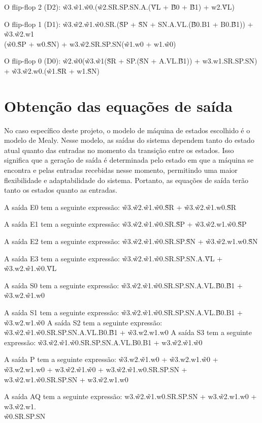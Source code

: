 O flip-flop 2 (D2): \~w3.\~w1.\~w0.(\~w2.SR.SP.SN.A.(\~VL + \~B0 + \~B1) + w2.\~VL)

O flip-flop 1 (D1): \~w3.\~w2.\~w1.\~w0.SR.(\~SP + \~SN + SN.A.VL.(\~B0.B1 + B0.\~B1)) + \~w3.\~w2.w1\\(\~w0.\~SP + w0.\~SN) + w3.\~w2.SR.SP.SN(\~w1.w0 + w1.\~w0)

O flip-flop 0 (D0): \~w2.\~w0(\~w3.\~w1(\~SR + SP.(\~SN + A.VL.\~B1)) + w3.w1.SR.SP.SN) + \~w3.\~w2.w0.(\~w1.\~SR + w1.\~SN)

\section{Obtenção das equações de saída}

No caso específico deste projeto, o modelo de máquina de estados escolhido é o modelo de Mealy. Nesse modelo, as saídas do sistema dependem tanto do estado atual quanto das entradas no momento da transição entre os estados. Isso significa que a geração de saída é determinada pelo estado em que a máquina se encontra e pelas entradas recebidas nesse momento, permitindo uma maior flexibilidade e adaptabilidade do sistema. Portanto, as equações de saída terão tanto os estados quanto as entradas.

A saída E0 tem a seguinte expressão: \~w3.\~w2.\~w1.\~w0.\~SR + \~w3.\~w2.\~w1.w0.\~SR		

A saída E1 tem a seguinte expressão: \~w3.\~w2.\~w1.\~w0.SR.\~SP + \~w3.\~w2.w1.\~w0.\~SP	

A saída E2 tem a seguinte expressão: \~w3.\~w2.\~w1.\~w0.SR.SP.\~SN + \~w3.\~w2.w1.w0.\~SN								

A saída E3 tem a seguinte expressão: \~w3.\~w2.\~w1.\~w0.SR.SP.SN.A.\~VL + \~w3.w2.\~w1.\~w0.\~VL	

A saída S0 tem a seguinte expressão: \~w3.\~w2.\~w1.\~w0.SR.SP.SN.A.VL.\~B0.\~B1 + \~w3.w2.\~w1.w0		

A saída S1 tem a seguinte expressão: \~w3.\~w2.\~w1.\~w0.SR.SP.SN.A.VL.\~B0.B1 + \~w3.w2.w1.\~w0								
A saída S2 tem a seguinte expressão: \~w3.\~w2.\~w1.\~w0.SR.SP.SN.A.VL.B0.\~B1 + \~w3.w2.w1.w0								
A saída S3 tem a seguinte expressão: \~w3.\~w2.\~w1.\~w0.SR.SP.SN.A.VL.B0.B1 + w3.\~w2.\~w1.\~w0	

A saída P tem a seguinte expressão:	\~w3.w2.\~w1.w0 + \~w3.w2.w1.\~w0 + \~w3.w2.w1.w0 + w3.\~w2.\~w1.\~w0 + w3.\~w2.\~w1.w0.SR.SP.SN + w3.\~w2.w1.\~w0.SR.SP.SN + w3.\~w2.w1.w0

A saída AQ tem a seguinte expressão: w3.\~w2.\~w1.w0.SR.SP.SN + w3.\~w2.w1.w0 + w3.\~w2.w1.\\ \~w0.SR.SP.SN		

